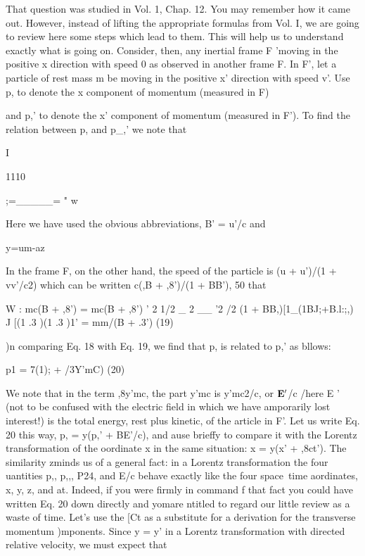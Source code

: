 That question was studied in Vol. 1, Chap. 12. You may remember
how it came out. However, instead of lifting the appropriate formulas
from Vol. I, we are going to review here some steps which lead
to them. This will help us to understand exactly what is going on.
Consider, then, any inertial frame F 'moving in the positive x direction
with speed 0 as observed in another frame F. In F', let a particle
of rest mass m be moving in the positive x' direction with speed v'.
Use p, to denote the x component of momentum (measured in F)

and p,' to denote the x' component of momentum (measured in F').
To find the relation between p, and p_,' we note that

I

1110

;=_____= " w

Here we have used the obvious abbreviations, B' = u'/c and

y=um-az

In the frame F, on the other hand, the speed of the particle is
(u + u')/(1 + vv'/c2) which can be written c(,B + ,8')/(1 + BB'),
50 that
\begin{equation}
\end{equation}

W : mc(B + ,8') = mc(B + ,8')
' 2 1/2 _ 2 __ '2 /2
(1 + BB,)[1_(1BJ;+B.l:;,) J [(1 .3 )(1 .3 )1'
= mm/(B + .3') (19)
\begin{equation}
\end{equation}

)n comparing Eq. 18 with Eq. 19, we find that p, is related to p,' as
bllows:

p1 = 7(1); + /3Y'mC) (20)
\begin{equation}
\end{equation}

We note that in the term ,8y'mc, the part y'mc is y'mc2/c, or $\mathbf{E}'$/c
/here E ' (not to be confused with the electric field in which we have
amporarily lost interest!) is the total energy, rest plus kinetic, of the
article in F'. Let us write Eq. 20 this way, p, = y(p,' + BE'/c), and
ause brieffy to compare it with the Lorentz transformation of the
oordinate x in the same situation: x = y(x' + ,8ct'). The similarity
zminds us of a general fact: in a Lorentz transformation the four
uantities p,, p,,, P24, and E/c behave exactly like the four space~time
aordinates, x, y, z, and at. Indeed, if you were firmly in command
f that fact you could have written Eq. 20 down directly and yomare
ntitled to regard our little review as a waste of time. Let's use the
[Ct as a substitute for a derivation for the transverse momentum
)mponents. Since y = y' in a Lorentz transformation with
directed relative velocity, we must expect that

